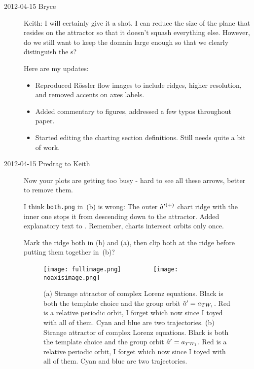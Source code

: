 \begin{description}
\item[2012-04-15 Bryce]

Keith: I will certainly give it a shot. I can reduce the size of the
plane that resides on the attractor so that it doesn't squash everything
else. However, do we still want to keep the domain large enough so that
we clearly distinguish the \poincBord s?

Here are my updates:
  	\begin{itemize}
  	\item Reproduced R\"ossler flow images to include ridges, higher
          resolution, and removed accents on axes labels.
  	\item Added commentary to figures, addressed a few typos throughout paper.
  	\item Started editing the charting section definitions. Still needs quite a bit of work.
  	\end{itemize}

\item[2012-04-15 Predrag to Keith] Now your plots are getting too busy -
hard to see all these arrows, better to remove them.

I think
\texttt{both.png} in \,(b) is wrong: The outer
$\hat{a}'{}^{(+)}$ chart ridge with the inner one stops it from descending
down to the attractor. Added explanatory text to .
Remember, charts intersect orbits only once.

Mark the ridge both in (b) and
(a), then clip both at the ridge before putting them
together in \,(b)?

 \begin{figure}[H]
 \begin{center}
\texttt{[image: fullimage.png]}%
~~~~~~~~
\texttt{[image: noaxisimage.png]}%
 \end{center}
 \caption{
(a)
Strange attractor of complex Lorenz equations.  Black is both the
template choice and the group orbit $\hat{a}' = a_{TW_{1}}$.  Red
is a relative periodic orbit, I forget which now since I toyed with all
of them.  Cyan and blue are two trajectories.
(b)
Strange attractor of complex Lorenz equations.  Black is both the
template choice and the group orbit $\hat{a}' = a_{TW_{1}}$.  Red
is a relative periodic orbit, I forget which now since I toyed with all
of them.  Cyan and blue are two trajectories.
    }{\label{fig:reducedspace}}
 \end{figure}


\end{description}
